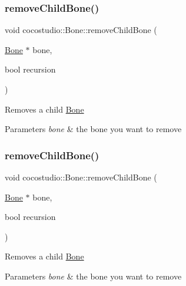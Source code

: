 \subsubsection{\texorpdfstring{remove\+Child\+Bone()}{removeChildBone()}\hspace{0.1cm}{\footnotesize\ttfamily [1/2]}}
{\footnotesize\ttfamily void cocostudio\+::\+Bone\+::remove\+Child\+Bone (\begin{DoxyParamCaption}\item[{\hyperlink{classcocostudio_1_1Bone}{Bone} $\ast$}]{bone,  }\item[{bool}]{recursion }\end{DoxyParamCaption})}

Removes a child \hyperlink{classcocostudio_1_1Bone}{Bone} 
\begin{DoxyParams}{Parameters}
{\em bone} & the bone you want to remove \\
\hline
\end{DoxyParams}
\mbox{\label{classcocostudio_1_1Bone_a59fa87941ea1aedd616e6b36ca7a5a25}} 
\subsubsection{\texorpdfstring{remove\+Child\+Bone()}{removeChildBone()}\hspace{0.1cm}{\footnotesize\ttfamily [2/2]}}
{\footnotesize\ttfamily void cocostudio\+::\+Bone\+::remove\+Child\+Bone (\begin{DoxyParamCaption}\item[{\hyperlink{classcocostudio_1_1Bone}{Bone} $\ast$}]{bone,  }\item[{bool}]{recursion }\end{DoxyParamCaption})}

Removes a child \hyperlink{classcocostudio_1_1Bone}{Bone} 
\begin{DoxyParams}{Parameters}
{\em bone} & the bone you want to remove \\
\hline
\end{DoxyParams}
\mbox{\label{classcocostudio_1_1Bone_a2421050fc95af899b04e69ef7d276404}} 
